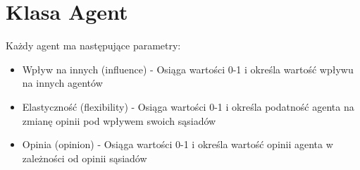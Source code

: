 \section{Klasa Agent}

Każdy agent ma następujące parametry:
\begin{itemize}
    \item Wpływ na innych (influence) - Osiąga wartości 0-1 i określa wartość wpływu na innych agentów
    \item Elastyczność (flexibility) - Osiąga wartości 0-1 i określa podatność agenta na zmianę opinii pod wpływem swoich sąsiadów
    \item Opinia (opinion) - Osiąga wartości 0-1 i określa wartość opinii agenta w zależności od opinii sąsiadów
\end{itemize}
